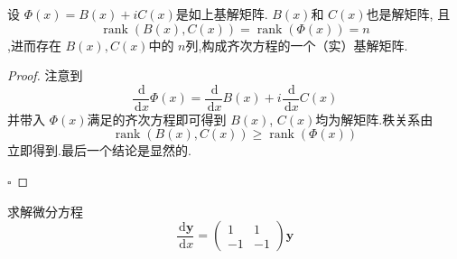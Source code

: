 \documentclass[lang=cn,12pt,color=green,fontset=none]{elegantbook}
\begin{document}
 \begin{theorem}
    设 $ \Phi \left( x \right) = B\left( x \right)+ i C\left( x \right)    $是如上基解矩阵. $ B\left( x \right)  $和 $ C\left( x \right)  $也是解矩阵,    且 $$
    \operatorname{rank}\left( B\left( x \right),C\left( x \right)   \right) = \operatorname{rank}\left( \Phi \left( x \right)  \right) = n  
    $$,进而存在 $ B\left( x \right),C\left( x \right)   $中的 $ n $列,构成齐次方程的一个（实）基解矩阵.  
 \end{theorem}
 \begin{proof}
    注意到 $$
    \frac{\,\mathrm{d}  }{\,\mathrm{d} x }\Phi \left( x \right) = \frac{\,\mathrm{d}  }{\,\mathrm{d} x }B\left( x \right)+  i \frac{\,\mathrm{d}  }{\,\mathrm{d} x }C\left( x \right)      
    $$并带入 $ \Phi \left( x \right)  $满足的齐次方程即可得到 $ B\left( x \right)  $, $ C\left( x \right)  $均为解矩阵.秩关系由 $$
    \operatorname{rank}\left( B\left( x \right),C\left( x \right)   \right)\ge \operatorname{rank}\left( \Phi \left( x \right)  \right)  
    $$ 立即得到.最后一个结论是显然的.
 
    \hfill $\square$
 \end{proof}
 \begin{example}
    求解微分方程 $$
    \frac{\,\mathrm{d} \mathbf{y} }{ \,\mathrm{d} x} = \begin{pmatrix} 
        1& 1\\ 
         -1& -1 
    \end{pmatrix} \mathbf{y}  
    $$
 \end{example}
\end{document}
